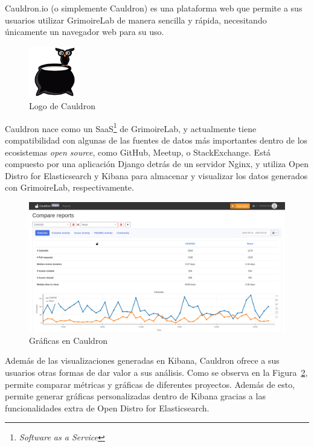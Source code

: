 Cauldron.io (o simplemente Cauldron) es una plataforma web que permite a sus usuarios utilizar GrimoireLab de manera sencilla y rápida, necesitando únicamente un navegador web para su uso. \emph{\parencite{Reference13}}

\begin{figure}[ht]
    \centering
    \includegraphics[width=0.2\textwidth]{Figures/cauldron-logo}
    \decoRule
    \caption[Cauldron (Logo)]{Logo de Cauldron \emph{\parencite{Reference13}}}
    \label{fig:cauldron-logo}
\end{figure}

Cauldron nace como un SaaS\footnote{\emph{Software as a Service}} de GrimoireLab, y actualmente tiene compatibilidad con algunas de las fuentes de datos más importantes dentro de los ecosistemas \emph{open source}, como GitHub, Meetup, o StackExchange. Está compuesto por una aplicación Django detrás de un servidor Nginx, y utiliza Open Distro for Elasticsearch y Kibana para almacenar y visualizar los datos generados con GrimoireLab, respectivamente.

\begin{figure}[ht]
    \centering
    \includegraphics[width=\textwidth]{Figures/cauldron-charts}
    \decoRule
    \caption[Cauldron (Gráficas)]{Gráficas en Cauldron \emph{\parencite{Reference13}}}
    \label{fig:cauldron-charts}
\end{figure}

Además de las visualizaciones generadas en Kibana, Cauldron ofrece a sus usuarios otras formas de dar valor a sus análisis. Como se observa en la Figura~\ref{fig:cauldron-charts}, permite comparar métricas y gráficas de diferentes proyectos. Además de esto, permite generar gráficas personalizadas dentro de Kibana gracias a las funcionalidades extra de Open Distro for Elasticsearch.

